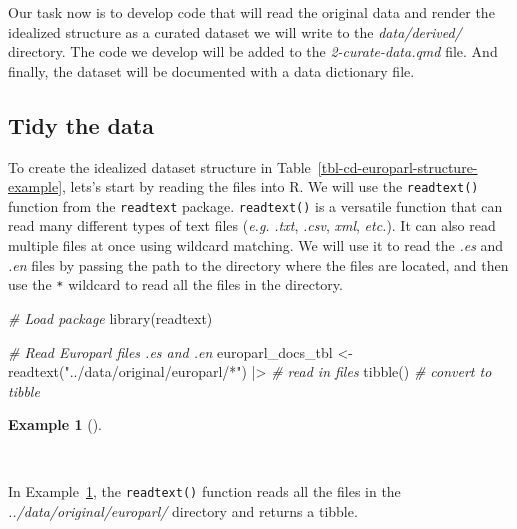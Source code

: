 \documentclass[
  letterpaper,
  DIV=11,
  numbers=noendperiod]{scrreport}
\newenvironment{Shaded}{\begin{snugshade}}{\end{snugshade}}
\newcommand{\CommentTok}[1]{\textcolor[rgb]{0.00,0.00,0.00}{\textit{#1}}}
\newcommand{\FunctionTok}[1]{\textcolor[rgb]{0.00,0.00,0.00}{#1}}
\newcommand{\NormalTok}[1]{\textcolor[rgb]{0.00,0.00,0.00}{#1}}
\newcommand{\OtherTok}[1]{\textcolor[rgb]{0.00,0.00,0.00}{#1}}
\newcommand{\SpecialCharTok}[1]{\textcolor[rgb]{0.00,0.00,0.00}{#1}}
\newcommand{\StringTok}[1]{\textcolor[rgb]{0.00,0.00,0.00}{#1}}
\theoremstyle{definition}
\newtheorem{example}{Example}[chapter]
\theoremstyle{remark}
\begin{document}
Our task now is to develop code that will read the original data and
render the idealized structure as a curated dataset we will write to the
\emph{data/derived/} directory. The code we develop will be added to the
\emph{2-curate-data.qmd} file. And finally, the dataset will be
documented with a data dictionary file.

\hypertarget{tidy-the-data}{%
\subsection{Tidy the data}\label{tidy-the-data}}

To create the idealized dataset structure in
Table~\ref{tbl-cd-europarl-structure-example}, lets's start by reading
the files into R. We will use the \texttt{readtext()} function from the
\texttt{readtext} package. \texttt{readtext()} is a versatile function
that can read many different types of text files (\emph{e.g.}
\emph{.txt}, \emph{.csv}, \emph{xml}, \emph{etc.}). It can also read
multiple files at once using wildcard matching. We will use it to read
the \emph{.es} and \emph{.en} files by passing the path to the directory
where the files are located, and then use the \texttt{*} wildcard to
read all the files in the directory.

\begin{Shaded}
\begin{Highlighting}[]
\CommentTok{\# Load package}
\FunctionTok{library}\NormalTok{(readtext)}

\CommentTok{\# Read Europarl files .es and .en}
\NormalTok{europarl\_docs\_tbl }\OtherTok{\textless{}{-}}
  \FunctionTok{readtext}\NormalTok{(}\StringTok{"../data/original/europarl/*"}\NormalTok{) }\SpecialCharTok{|\textgreater{}} \CommentTok{\# read in files}
  \FunctionTok{tibble}\NormalTok{() }\CommentTok{\# convert to tibble}
\end{Highlighting}
\end{Shaded}

\begin{example}[]\protect\hypertarget{exm-cd-europarl-readtext}{}\label{exm-cd-europarl-readtext}

~

\end{example}

In Example~\ref{exm-cd-europarl-readtext}, the \texttt{readtext()}
function reads all the files in the \emph{../data/original/europarl/}
directory and returns a tibble.
\end{document}
